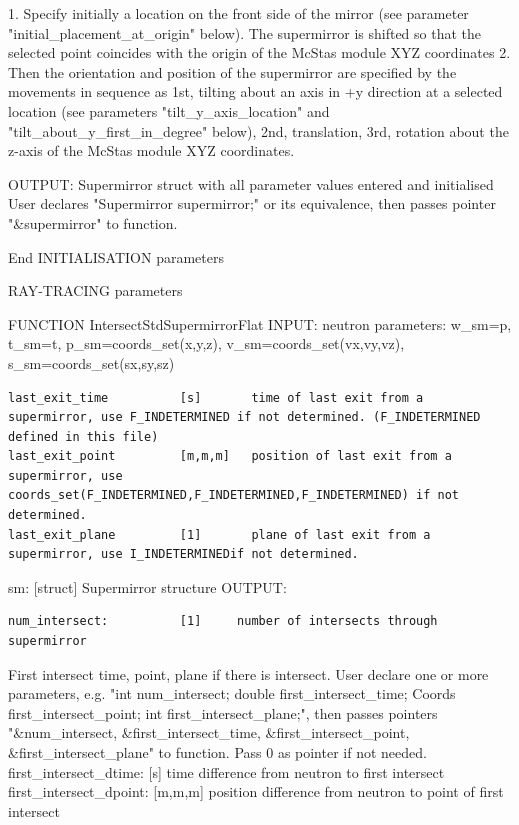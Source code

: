 1. Specify initially a location on the front side of the mirror (see parameter "initial\_placement\_at\_origin" below). The supermirror is shifted so that the selected point coincides with the origin of the McStas module XYZ coordinates 2. Then the orientation and position of the supermirror are specified by the movements in sequence as 1st, tilting about an axis in +y direction at a selected location (see parameters "tilt\_y\_axis\_location" and "tilt\_about\_y\_first\_in\_degree" below), 2nd, translation, 3rd, rotation about the z-axis of the McStas module XYZ coordinates.

OUTPUT: Supermirror struct with all parameter values entered and initialised User declares "Supermirror supermirror;" or its equivalence, then passes pointer "\&supermirror" to function.

End INITIALISATION parameters

RAY-TRACING parameters

FUNCTION IntersectStdSupermirrorFlat INPUT: neutron parameters: w\_sm=p, t\_sm=t, p\_sm=coords\_set(x,y,z), v\_sm=coords\_set(vx,vy,vz), s\_sm=coords\_set(sx,sy,sz)

\begin{verbatim}
last_exit_time			[s]       time of last exit from a supermirror, use F_INDETERMINED if not determined. (F_INDETERMINED defined in this file)
last_exit_point			[m,m,m]   position of last exit from a supermirror, use coords_set(F_INDETERMINED,F_INDETERMINED,F_INDETERMINED) if not determined.
last_exit_plane			[1]       plane of last exit from a supermirror, use I_INDETERMINEDif not determined.
\end{verbatim}

sm: [struct] Supermirror structure OUTPUT:

\begin{verbatim}
num_intersect:          [1]		number of intersects through supermirror
\end{verbatim}

First intersect time, point, plane if there is intersect. User declare one or more parameters, e.g. "int num\_intersect; double first\_intersect\_time; Coords first\_intersect\_point; int first\_intersect\_plane;", then passes pointers "\&num\_intersect, \&first\_intersect\_time, \&first\_intersect\_point, \&first\_intersect\_plane" to function. Pass 0 as pointer if not needed. first\_intersect\_dtime: [s] time difference from neutron to first intersect first\_intersect\_dpoint: [m,m,m] position difference from neutron to point of first intersect

